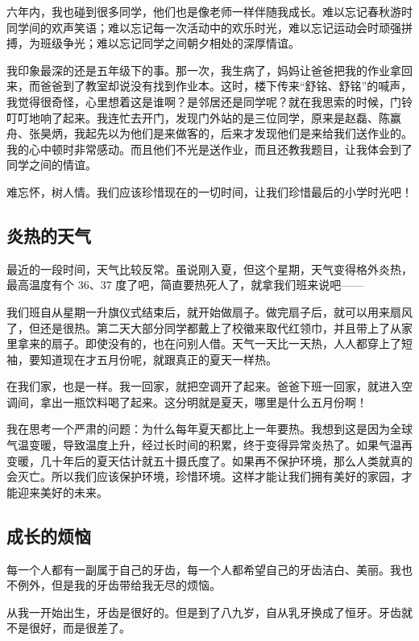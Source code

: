 \documentclass[UTF8,a4paper,titlepage,twoside,10.5pt]{article}
\begin{document}
六年内，我也碰到很多同学，他们也是像老师一样伴随我成长。难以忘记春秋游时同学间的欢声笑语；难以忘记每一次活动中的欢乐时光，难以忘记运动会时顽强拼搏，为班级争光；难以忘记同学之间朝夕相处的深厚情谊。

我印象最深的还是五年级下的事。那一次，我生病了，妈妈让爸爸把我的作业拿回来，而爸爸到了教室却说没有找到作业本。这时，楼下传来“舒铭、舒铭”的喊声，我觉得很奇怪，心里想着这是谁啊？是邻居还是同学呢？就在我思索的时候，门铃叮叮地响了起来。我连忙去开门，发现门外站的是三位同学，原来是赵磊、陈赢舟、张昊炳，我起先以为他们是来做客的，后来才发现他们是来给我们送作业的。我的心中顿时非常感动。而且他们不光是送作业，而且还教我题目，让我体会到了同学之间的情谊。

难忘怀，树人情。我们应该珍惜现在的一切时间，让我们珍惜最后的小学时光吧！

\subsection{炎热的天气}
\label{sec:orgf0a967f}

最近的一段时间，天气比较反常。虽说刚入夏，但这个星期，天气变得格外炎热，最高温度有个 36、37 度了吧，简直要热死人了，就拿我们班来说吧——

我们班自从星期一升旗仪式结束后，就开始做扇子。做完扇子后，就可以用来扇风了，但还是很热。第二天大部分同学都戴上了校徽来取代红领巾，并且带上了从家里拿来的扇子。即使没有的，也在问别人借。天气一天比一天热，人人都穿上了短袖，要知道现在才五月份呢，就跟真正的夏天一样热。

在我们家，也是一样。我一回家，就把空调开了起来。爸爸下班一回家，就进入空调间，拿出一瓶饮料喝了起来。这分明就是夏天，哪里是什么五月份啊！

我在思考一个严肃的问题：为什么每年夏天都比上一年要热。我想到这是因为全球气温变暖，导致温度上升，经过长时间的积累，终于变得异常炎热了。如果气温再变暖，几十年后的夏天估计就五十摄氏度了。如果再不保护环境，那么人类就真的会灭亡。所以我们应该保护环境，珍惜环境。这样才能让我们拥有美好的家园，才能迎来美好的未来。

\subsection{成长的烦恼}
\label{sec:orgc6432ed}

每一个人都有一副属于自己的牙齿，每一个人都希望自己的牙齿洁白、美丽。我也不例外，但是我的牙齿带给我无尽的烦恼。

从我一开始出生，牙齿是很好的。但是到了八九岁，自从乳牙换成了恒牙。牙齿就不是很好，而是很差了。
\end{document}
